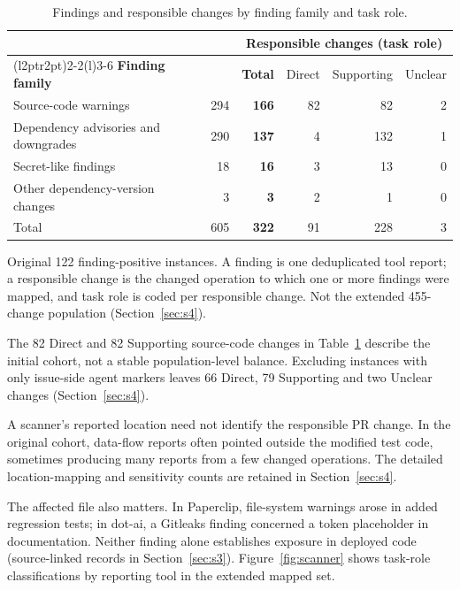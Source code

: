 \documentclass[acmsmall,screen,nonacm]{acmart}
\begin{document}
\begin{table}[!tbp]
\caption{Findings and responsible changes by finding family and task role.}
\label{tab:role}
\small
\begin{tabular}{@{}l>{\columncolor{unitshade}}r@{\hspace{10pt}}rrrr@{}}
\toprule
& \multicolumn{1}{>{\columncolor{unitshade}}c}{\textbf{Findings}} & \multicolumn{4}{c}{\textbf{Responsible changes (task role)}}\\
\cmidrule(l{2pt}r{2pt}){2-2}\cmidrule(l){3-6}
\textbf{Finding family} & \multicolumn{1}{>{\columncolor{unitshade}}r}{Reported} & \textbf{Total} & Direct & Supporting & Unclear\\
\midrule
Source-code warnings & 294 & \textbf{166} & 82 & 82 & 2\\
Dependency advisories and downgrades & 290 & \textbf{137} & 4 & 132 & 1\\
Secret-like findings & 18 & \textbf{16} & 3 & 13 & 0\\
Other dependency-version changes & 3 & \textbf{3} & 2 & 1 & 0\\
\midrule
Total & 605 & \textbf{322} & 91 & 228 & 3\\
\bottomrule
\end{tabular}
\par\smallskip\raggedright\footnotesize Original 122 finding-positive instances. A finding is one deduplicated tool report; a responsible change is the changed operation to which one or more findings were mapped, and task role is coded per responsible change. Not the extended 455-change population (Section~\ref{sec:s4}).
\end{table}

The 82 Direct and 82 Supporting source-code changes in Table~\ref{tab:role} describe the initial cohort, not a stable population-level balance. Excluding instances with only issue-side agent markers leaves 66 Direct, 79 Supporting and two Unclear changes (Section~\ref{sec:s4}).

A scanner's reported location need not identify the responsible PR change. In the original cohort, data-flow reports often pointed outside the modified test code, sometimes producing many reports from a few changed operations. The detailed location-mapping and sensitivity counts are retained in Section~\ref{sec:s4}.

The affected file also matters. In Paperclip, file-system warnings arose in added regression tests; in dot-ai, a Gitleaks finding concerned a token placeholder in documentation. Neither finding alone establishes exposure in deployed code (source-linked records in Section~\ref{sec:s3}). Figure~\ref{fig:scanner} shows task-role classifications by reporting tool in the extended mapped set.
\end{document}
